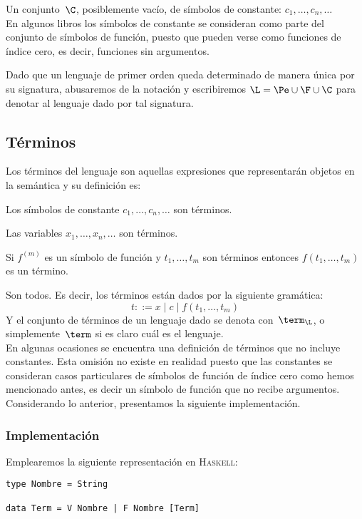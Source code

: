 \documentclass[11pt,letterpaper]{article}
\begin{document}
 \item Un conjunto~$\C$, posiblemente vacío, de símbolos de constante:
  $c_1,\ldots,c_n,\ldots$\\
  En algunos libros los símbolos de constante se consideran como parte del
  conjunto de símbolos de función, puesto que pueden verse como funciones de
  índice cero, es decir, funciones sin argumentos.
\ei

Dado que un lenguaje de primer orden queda determinado de manera única por su 
signatura, abusaremos de la notación y escribiremos $\L=\Pe\cup\F\cup\C $
para denotar al lenguaje dado por tal signatura.


\subsection{Términos}  
Los términos del lenguaje son aquellas expresiones que representarán
objetos en la semántica y su definición es:
\bi
 \item Los símbolos de constante $c_1,\ldots,c_n,\ldots$ son términos.
 \item Las variables $x_1,\ldots,x_n,\ldots$ son términos. 
 \item Si $f^{(m)}$ es un símbolo de función y $t_1,\ldots,t_m$ son términos 
  entonces $f(t_1,\ldots,t_m)$ es un término.
 \item Son todos.
\ei
Es decir, los términos están dados por la siguiente gramática:
$$ t ::= x \mid c \mid f(t_1,\ldots,t_m) $$
Y el conjunto de términos de un lenguaje dado se denota con~$\term_\L$, o
simplemente~$\term$ si es claro cuál es el lenguaje. \\

En algunas ocasiones se encuentra una definición de términos que no incluye 
constantes. Esta omisión no existe en realidad puesto que las constantes se 
consideran casos particulares de símbolos de función de índice cero como hemos 
mencionado antes, es decir un símbolo de función que no recibe argumentos. 
Considerando lo anterior, presentamos la siguiente implementación.

\subsubsection{Implementación}

\noindent Emplearemos la siguiente representación en \textsc{Haskell}:

\begin{verbatim}
type Nombre = String

data Term = V Nombre | F Nombre [Term]
\end{verbatim}
\end{document}
